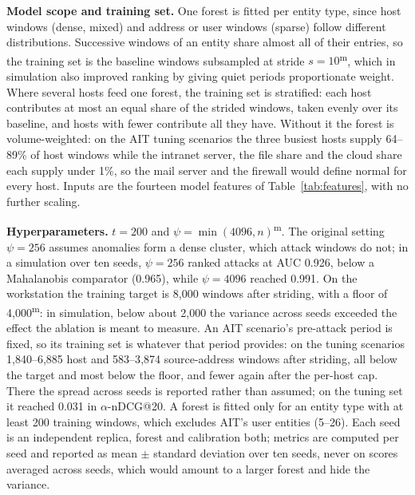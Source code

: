 \documentclass[conference]{IEEEtran}
\newcommand{\meas}{\textsuperscript{\textcolor{green!45!black}{m}}}    %
\begin{document}
\textbf{Model scope and training set.} One forest is fitted per entity type, since host windows (dense, mixed) and address or user windows (sparse) follow different distributions. Successive windows of an entity share almost all of their entries, so the training set is the baseline windows subsampled at stride $s = 10$\meas{}, which in simulation also improved ranking by giving quiet periods proportionate weight. Where several hosts feed one forest, the training set is stratified: each host contributes at most an equal share of the strided windows, taken evenly over its baseline, and hosts with fewer contribute all they have. Without it the forest is volume-weighted: on the AIT tuning scenarios the three busiest hosts supply 64--89\% of host windows while the intranet server, the file share and the cloud share each supply under 1\%, so the mail server and the firewall would define normal for every host. Inputs are the fourteen model features of Table~\ref{tab:features}, with no further scaling.

\textbf{Hyperparameters.} $t = 200$ and $\psi = \min(4096, n)$\meas{}. The original setting $\psi = 256$ assumes anomalies form a dense cluster, which attack windows do not; in a simulation over ten seeds, $\psi = 256$ ranked attacks at AUC 0.926, below a Mahalanobis comparator (0.965), while $\psi = 4096$ reached 0.991. On the workstation the training target is 8{,}000 windows after striding, with a floor of 4{,}000\meas{}: in simulation, below about 2{,}000 the variance across seeds exceeded the effect the ablation is meant to measure. An AIT scenario's pre-attack period is fixed, so its training set is whatever that period provides: on the tuning scenarios 1{,}840--6{,}885 host and 583--3{,}874 source-address windows after striding, all below the target and most below the floor, and fewer again after the per-host cap. There the spread across seeds is reported rather than assumed; on the tuning set it reached 0.031 in $\alpha$-nDCG@20. A forest is fitted only for an entity type with at least 200 training windows, which excludes AIT's user entities (5--26). Each seed is an independent replica, forest and calibration both; metrics are computed per seed and reported as mean $\pm$ standard deviation over ten seeds, never on scores averaged across seeds, which would amount to a larger forest and hide the variance.
\end{document}
